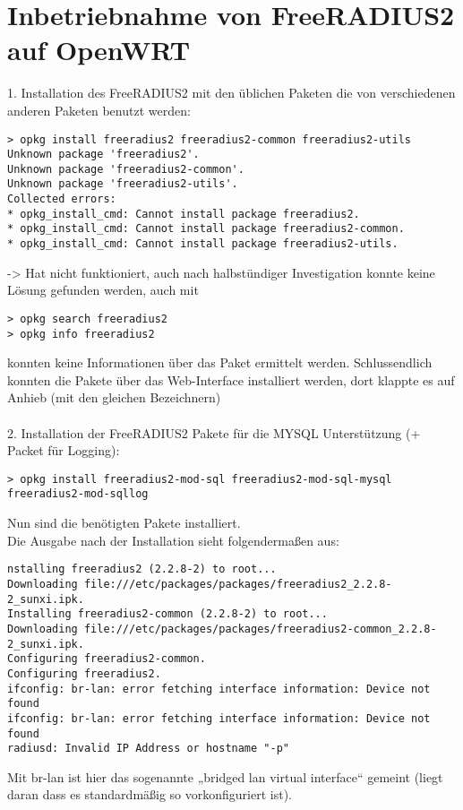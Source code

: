 \section{Inbetriebnahme von FreeRADIUS2 auf OpenWRT}
1. Installation des FreeRADIUS2 mit den üblichen Paketen die von verschiedenen anderen Paketen
benutzt werden:
\begin{lstlisting}
> opkg install freeradius2 freeradius2-common freeradius2-utils
Unknown package 'freeradius2'.
Unknown package 'freeradius2-common'.
Unknown package 'freeradius2-utils'.
Collected errors:
* opkg_install_cmd: Cannot install package freeradius2.
* opkg_install_cmd: Cannot install package freeradius2-common.
* opkg_install_cmd: Cannot install package freeradius2-utils.
\end{lstlisting}
-> Hat nicht funktioniert, auch nach halbstündiger Investigation konnte keine Lösung gefunden
werden, auch mit
\begin{lstlisting}
> opkg search freeradius2
> opkg info freeradius2
\end{lstlisting}
konnten keine Informationen über das Paket ermittelt werden. Schlussendlich konnten die Pakete
über das Web-Interface installiert werden, dort klappte es auf Anhieb (mit den gleichen
Bezeichnern)\\
~\\
2. Installation der FreeRADIUS2 Pakete für die MYSQL Unterstützung (+ Packet für Logging):
\begin{lstlisting}
> opkg install freeradius2-mod-sql freeradius2-mod-sql-mysql freeradius2-mod-sqllog
\end{lstlisting}
Nun sind die benötigten Pakete installiert.\\
\newpage
Die Ausgabe nach der Installation sieht folgendermaßen aus:
\begin{lstlisting}
nstalling freeradius2 (2.2.8-2) to root...
Downloading file:///etc/packages/packages/freeradius2_2.2.8-2_sunxi.ipk.
Installing freeradius2-common (2.2.8-2) to root...
Downloading file:///etc/packages/packages/freeradius2-common_2.2.8-2_sunxi.ipk.
Configuring freeradius2-common.
Configuring freeradius2.
ifconfig: br-lan: error fetching interface information: Device not found
ifconfig: br-lan: error fetching interface information: Device not found
radiusd: Invalid IP Address or hostname "-p"
\end{lstlisting}
Mit br-lan ist hier das sogenannte „bridged lan virtual interface“ gemeint (liegt daran dass es
standardmäßig so vorkonfiguriert ist).\\
